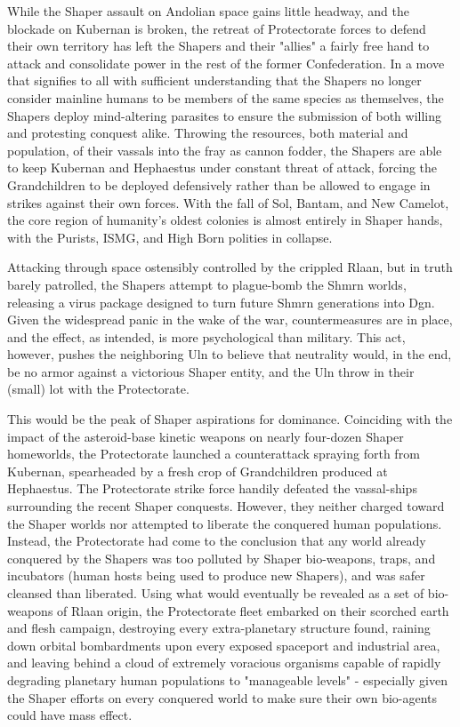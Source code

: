 While the Shaper assault on Andolian space gains little headway, and
the blockade on Kubernan is broken, the retreat of Protectorate forces
to defend their own territory has left the Shapers and their "allies"
a fairly free hand to attack and consolidate power in the rest of the
former Confederation. In a move that signifies to all with sufficient
understanding that the Shapers no longer consider mainline humans to
be members of the same species as themselves, the Shapers deploy
mind-altering parasites to ensure the submission of both willing and
protesting conquest alike. Throwing the resources, both material and
population, of their vassals into the fray as cannon fodder, the
Shapers are able to keep Kubernan and Hephaestus under constant threat
of attack, forcing the Grandchildren to be deployed defensively rather
than be allowed to engage in strikes against their own forces. With
the fall of Sol, Bantam, and New Camelot, the core region of
humanity's oldest colonies is almost entirely in Shaper hands, with
the Purists, ISMG, and High Born polities in collapse.

Attacking through space ostensibly controlled by the crippled Rlaan,
but in truth barely patrolled, the Shapers attempt to plague-bomb the
Shmrn worlds, releasing a virus package designed to turn future Shmrn
generations into Dgn. Given the widespread panic in the wake of the
war, countermeasures are in place, and the effect, as intended, is
more psychological than military. This act, however, pushes the
neighboring Uln to believe that neutrality would, in the end, be no
armor against a victorious Shaper entity, and the Uln throw in their
(small) lot with the Protectorate.

This would be the peak of Shaper aspirations for dominance. Coinciding
with the impact of the asteroid-base kinetic weapons on nearly
four-dozen Shaper homeworlds, the Protectorate launched a
counterattack spraying forth from Kubernan, spearheaded by a fresh
crop of Grandchildren produced at Hephaestus. The Protectorate strike
force handily defeated the vassal-ships surrounding the recent Shaper
conquests. However, they neither charged toward the Shaper worlds nor
attempted to liberate the conquered human populations. Instead, the
Protectorate had come to the conclusion that any world already
conquered by the Shapers was too polluted by Shaper bio-weapons,
traps, and incubators (human hosts being used to produce new Shapers),
and was safer cleansed than liberated. Using what would eventually be
revealed as a set of bio-weapons of Rlaan origin, the Protectorate
fleet embarked on their scorched earth and flesh campaign, destroying
every extra-planetary structure found, raining down orbital
bombardments upon every exposed spaceport and industrial area, and
leaving behind a cloud of extremely voracious organisms capable of
rapidly degrading planetary human populations to "manageable levels" -
especially given the Shaper efforts on every conquered world to make
sure their own bio-agents could have mass effect.

